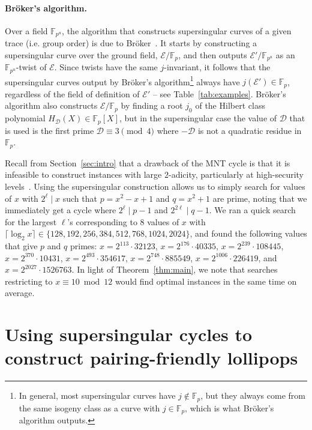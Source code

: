 \documentclass[version=preprint]{iacrcc}
\newcommand{\F}{\mathbb{F}}
\newcommand{\EC}{\mathcal{E}}
\newcommand{\D}{\mathcal{D}}
\begin{document}
\paragraph{Br{\"o}ker's algorithm.} Over a field $\F_{p^u}$, the algorithm that constructs supersingular curves of a given trace (i.e. group order) is due to Br{\"o}ker~\cite{broker}. It starts by constructing a supersingular curve over the ground field, $\EC/\F_p$, and then outputs $\EC'/\F_{p^u}$ as an $\F_{p^u}$-twist of $\EC$. Since twists have the same $j$-invariant, it follows that the supersingular curves output by Br{\"o}ker's algorithm\footnote{In general, most supersingular curves have $j \not\in \F_{p}$, but they always come from the same isogeny class as a curve with $j \in \F_p$, which is what Br{\"o}ker's algorithm outputs.} always have $j(\EC') \in \F_p$, regardless of the field of definition of $\EC'$ -- see Table~\ref{tab:examples}. Br{\"o}ker's algorithm also constructs $\EC/\F_p$ by finding a root $j_0$ of the Hilbert class polynomial $H_\D(X) \in \F_p[X]$, but in the supersingular case the value of $\D$ that is used is the first prime $\D \equiv 3 \pmod{4}$ where $-\D$ is not a quadratic residue in $\F_p$. 

\begin{remark}\label{rem:without}
Recall from Section~\ref{sec:intro} that a drawback of the MNT cycle is that it is infeasible to construct instances with large $2$-adicity, particularly at high-security levels~\cite{scalable,guillevic}. Using the supersingular construction allows us to simply search for values of $x$ with $2^\ell \mid x$ such that $p=x^2-x+1$ and $q=x^2+1$ are prime, noting that we immediately get a cycle where $2^\ell \mid p-1$ and $2^{2\ell} \mid q-1$. We ran a quick search for the largest $\ell$'s corresponding to 8 values of $x$ with $\lceil \log_2 x \rceil \in \{128,192,256,384,512,768,1024,2024\}$, and found the following values that give $p$ and $q$ primes: $x=2^{113}\cdot 32123$, $x=2^{176}\cdot 40335$, $x=2^{239}\cdot 108445$, $x=2^{370}\cdot 10431$, $x=2^{493}\cdot 354617$, $x=2^{748}\cdot 885549$, $x=2^{1006}\cdot 226419$, and $x=2^{2027}\cdot 1526763$. In light of Theorem~\ref{thm:main}, we note that searches restricting to $x \equiv 10 \bmod{12}$ would find optimal instances in the same time on average. 
\end{remark}


\section{Using supersingular cycles to construct pairing-friendly lollipops}\label{sec:constructing}
\end{document}

